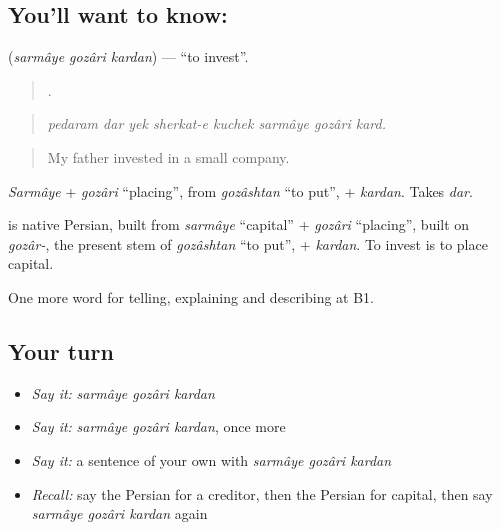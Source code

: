 \subsection*{You'll want to know:   }
\textbf{  } (\emph{sarmâye gozâri kardan}) — \textquotedblleft{}to invest\textquotedblright{}.

\begin{quote}
       .
\end{quote}

\begin{quote}
\emph{pedaram dar yek sherkat-e kuchek sarmâye gozâri kard.}
\end{quote}

\begin{quote}
My father invested in a small company.
\end{quote}

\emph{Sarmâye} + \emph{gozâri} \textquotedblleft{}placing\textquotedblright{}, from \emph{gozâshtan} \textquotedblleft{}to put\textquotedblright{}, + \emph{kardan}. Takes \emph{dar}.

\begin{cousinweb}
\textbf{  } is native Persian, built from \emph{sarmâye} \textquotedblleft{}capital\textquotedblright{} + \emph{gozâri} \textquotedblleft{}placing\textquotedblright{}, built on \emph{gozâr-}, the present stem of \emph{gozâshtan} \textquotedblleft{}to put\textquotedblright{}, + \emph{kardan}. To invest is to place capital.
\end{cousinweb}

\begin{grammarlens}[title={What you've built}]
One more word for telling, explaining and describing at B1.
\end{grammarlens}

\subsection*{Your turn}
\begin{itemize}
\raggedright
  \item \emph{Say it:} \emph{sarmâye gozâri kardan}
  \item \emph{Say it:} \emph{sarmâye gozâri kardan}, once more
  \item \emph{Say it:} a sentence of your own with \emph{sarmâye gozâri kardan}
  \item \emph{Recall:} say the Persian for a creditor, then the Persian for capital, then say \emph{sarmâye gozâri kardan} again
\end{itemize}

